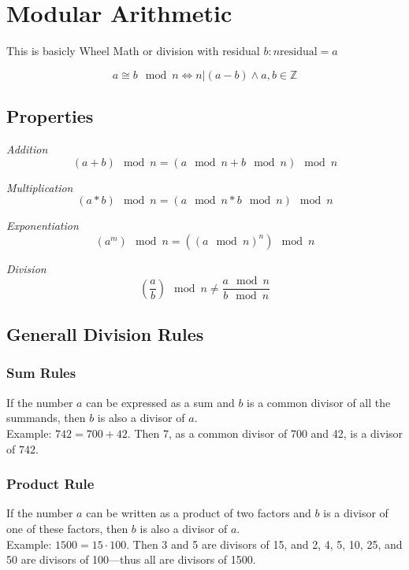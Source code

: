 \section{Modular Arithmetic}

This is basicly Wheel Math or division with residual \(b : n \text{residual} = a\)

\[a \cong b \mod n \iff n | (a - b) \land  a,b \in \mathbb{Z}\]

\subsection{Properties}

\emph{Addition}
\[(a + b) \mod n = (a \mod n + b \mod n) \mod n\]

\emph{Multiplication}
\[(a * b) \mod n = (a \mod n * b \mod n) \mod n\]

\emph{Exponentiation}
\[(a^m) \mod n = ((a \mod n)^n) \mod n\]

\emph{Division}
\[(\frac{a}{b}) \mod n \ne  \frac{a \mod n}{b \mod n}\]

\subsection{Generall Division Rules}

\subsubsection*{Sum Rules}

If the number \( a \) can be expressed as a sum and \( b \) is a common divisor of all the summands, then \( b \) is also a divisor of \( a \). \\
 Example: \( 742 = 700 + 42 \). Then 7, as a common divisor of 700 and 42, is a divisor of 742.

\subsubsection*{Product Rule}

If the number \( a \) can be written as a product of two factors and \( b \) is a divisor of one of these factors, then \( b \) is also a divisor of \( a \). \\
Example: \( 1500 = 15 \cdot 100 \). Then 3 and 5 are divisors of 15, and 2, 4, 5, 10, 25, and 50 are divisors of 100—thus all are divisors of 1500.


